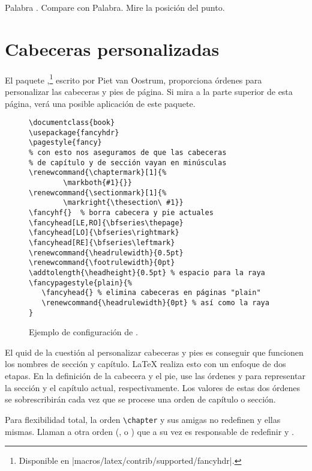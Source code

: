 \begin{example}
Palabra . Compare
con Palabra. Mire
la posición del punto.
\end{example}

\section{Cabeceras personalizadas}
\label{sec:fancy}

El paquete ,\footnote{Disponible en
  \CTANref|macros/latex/contrib/supported/fancyhdr|.} escrito por Piet
  van Oostrum, proporciona órdenes para personalizar las cabeceras y
  pies de página.  Si mira a la parte superior de esta página, verá
  una posible aplicación de este paquete.

\begin{figure}[!htbp]
\begin{lined}{\textwidth}
\begin{verbatim}
\documentclass{book}
\usepackage{fancyhdr}
\pagestyle{fancy}
% con esto nos aseguramos de que las cabeceras
% de capítulo y de sección vayan en minúsculas
\renewcommand{\chaptermark}[1]{%
        \markboth{#1}{}}
\renewcommand{\sectionmark}[1]{%
        \markright{\thesection\ #1}}
\fancyhf{}  % borra cabecera y pie actuales
\fancyhead[LE,RO]{\bfseries\thepage}
\fancyhead[LO]{\bfseries\rightmark}
\fancyhead[RE]{\bfseries\leftmark}
\renewcommand{\headrulewidth}{0.5pt}
\renewcommand{\footrulewidth}{0pt}
\addtolength{\headheight}{0.5pt} % espacio para la raya
\fancypagestyle{plain}{%
   \fancyhead{} % elimina cabeceras en páginas "plain"
   \renewcommand{\headrulewidth}{0pt} % así como la raya
}
\end{verbatim}
\end{lined}
\caption{Ejemplo de configuración de .} \label{fancyhdr}
\end{figure}

El quid de la cuestión al personalizar cabeceras y pies es conseguir
que funcionen los nombres de sección y capítulo.  \LaTeX{}
realiza esto con un enfoque de dos etapas.  En la definición de la
cabecera y el pie, use las órdenes   y 
para representar la sección y el capítulo actual, respectivamente.
Los valores de estas dos órdenes se sobrescribirán cada vez que se
procese una orden de capítulo o sección.

Para flexibilidad total, la orden \verb|\chapter| y sus amigas no
redefinen  y  ellas mismas.  Llaman a otra
orden (,  o ) que a
su vez
es responsable de redefinir  y .

